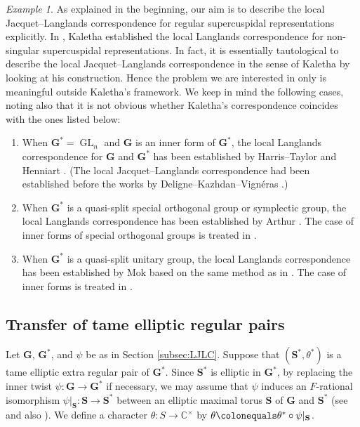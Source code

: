 \documentclass{amsart}
\newcommand{\C}{\mathbb{C}}
\newcommand{\bfG}{\mathbf{G}}
\newcommand{\bfS}{\mathbf{S}}
\DeclareMathOperator{\GL}{GL}
\theoremstyle{plain}
\theoremstyle{definition}
\theoremstyle{remark}
\newtheorem{example}[thm]{Example}
\theoremstyle{theorem}
\begin{document}
\begin{example}\label{ex:LLC}
As explained in the beginning, our aim is to describe the local Jacquet--Langlands correspondence for regular supercuspidal representations explicitly.
In \cite{Kal19,Kal19-sc}, Kaletha established the local Langlands correspondence for non-singular supercuspidal representations.
In fact, it is essentially tautological to describe the local Jacquet--Langlands correspondence in the sense of Kaletha by looking at his construction.
Hence the problem we are interested in only is meaningful outside Kaletha's framework. 
We keep in mind the following cases, noting also that it is not obvious whether Kaletha's correspondence coincides with the ones listed below:
\begin{enumerate}
\item
When $\bfG^{\ast}=\GL_{n}$ and $\bfG$ is an inner form of $\bfG^{\ast}$, the local Langlands correspondence for $\bfG$ and $\bfG^{\ast}$ has been established by Harris--Taylor \cite{HT01} and Henniart \cite{Hen00}.
(The local Jacquet--Langlands correspondence had been established before the works \cite{HT01,Hen00} by Deligne--Kazhdan--Vign\'eras \cite{DKV84}.)
\item
When $\bfG^{\ast}$ is a quasi-split special orthogonal group or symplectic group, the local Langlands correspondence has been established by Arthur \cite{Art13}.
The case of inner forms of special orthogonal groups is treated in \cite{MR18}.
\item
When $\bfG^{\ast}$ is a quasi-split unitary group, the local Langlands correspondence has been established by Mok \cite{Mok15} based on the same method as in \cite{Art13}.
The case of inner forms is treated in \cite{KMSW14}.
\end{enumerate}
\end{example}



\subsection{Transfer of tame elliptic regular pairs}\label{subsec:transfer}
Let $\bfG$, $\bfG^{\ast}$, and $\psi$ be as in Section \ref{subsec:LJLC}.
Suppose that $(\bfS^{\ast},\theta^{\ast})$ is a tame elliptic extra regular pair of $\bfG^{\ast}$.
Since $\bfS^{\ast}$ is elliptic in $\bfG^{\ast}$, by replacing the inner twist $\psi\colon\bfG\rightarrow\bfG^{\ast}$ if necessary, we may assume that $\psi$ induces an $F$-rational isomorphism $\psi|_{\bfS}\colon\bfS\rightarrow\bfS^{\ast}$ between an elliptic maximal torus $\bfS$ of $\bfG$ and $\bfS^{\ast}$ (see \cite[Section 10]{Kot86} and also \cite[Section 3.2]{Kal19}).
We define a character $\theta\colon S\rightarrow\C^{\times}$ by $\theta\colonequals \theta^{\ast}\circ\psi|_{\bfS}$.
\end{document}
